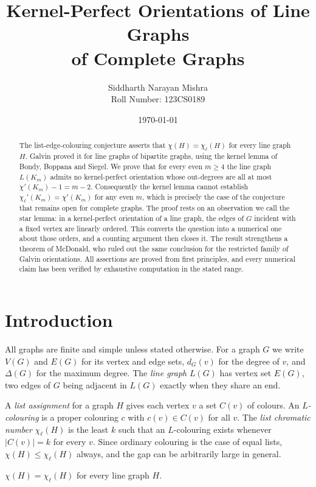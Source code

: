 \documentclass[11pt]{article}
\title{\bfseries Kernel-Perfect Orientations of Line Graphs\\
of Complete Graphs}
\author{Siddharth Narayan Mishra\\[2pt] Roll Number: 123CS0189}
\date{\today}
\numberwithin{equation}{section}
\theoremstyle{plain}
\newcommand{\chl}{\chi_{\ell}}
\newcommand{\chpl}{\chi_{\ell}'}
\newcommand{\LG}{L}
\begin{document}
\maketitle

\begin{abstract}
The list-edge-colouring conjecture asserts that $\chi(H)=\chl(H)$ for every line graph $H$.
Galvin proved it for line graphs of bipartite graphs, using the kernel lemma of Bondy,
Boppana and Siegel. We prove that for every even $m\ge 4$ the line graph $\LG(K_m)$ admits
no kernel-perfect orientation whose out-degrees are all at most $\chi'(K_m)-1=m-2$.
Consequently the kernel lemma cannot establish $\chpl(K_m)=\chi'(K_m)$ for any even $m$,
which is precisely the case of the conjecture that remains open for complete graphs.
The proof rests on an observation we call the star lemma: in a kernel-perfect orientation of
a line graph, the edges of $G$ incident with a fixed vertex are linearly ordered. This
converts the question into a numerical one about those orders, and a counting argument then
closes it. The result strengthens a theorem of McDonald, who ruled out the same conclusion
for the restricted family of Galvin orientations. All assertions are proved from first
principles, and every numerical claim has been verified by exhaustive computation in the
stated range.
\end{abstract}

\tableofcontents

\section{Introduction}

All graphs are finite and simple unless stated otherwise. For a graph $G$ we write $V(G)$ and
$E(G)$ for its vertex and edge sets, $d_G(v)$ for the degree of $v$, and $\Delta(G)$ for the
maximum degree. The \emph{line graph} $\LG(G)$ has vertex set $E(G)$, two edges of $G$ being
adjacent in $\LG(G)$ exactly when they share an end.

A \emph{list assignment} for a graph $H$ gives each vertex $v$ a set $C(v)$ of colours. An
\emph{$L$-colouring} is a proper colouring $c$ with $c(v)\in C(v)$ for all $v$. The
\emph{list chromatic number} $\chl(H)$ is the least $k$ such that an $L$-colouring exists
whenever $|C(v)|=k$ for every $v$. Since ordinary colouring is the case of equal lists,
$\chi(H)\le\chl(H)$ always, and the gap can be arbitrarily large in general.

\begin{conjecture}\label{conj:lecc}
$\chi(H)=\chl(H)$ for every line graph $H$.
\end{conjecture}
\end{document}
